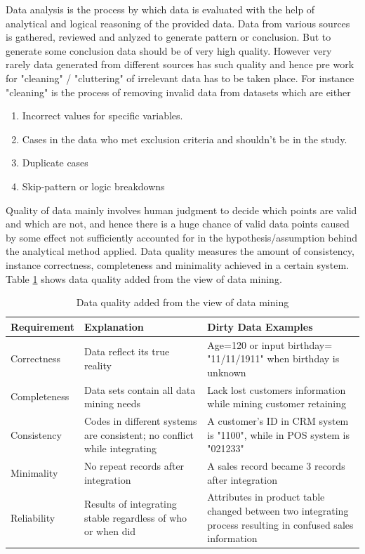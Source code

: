 \documentclass[article,type=msc,colorback,accentcolor=tud9c,twoside,11pt]{tudthesis}
\begin{document}
Data analysis is the process by which data is evaluated with the help of analytical and logical reasoning of the provided data. Data from various sources is gathered, reviewed and anlyzed to generate pattern or conclusion. But to generate some conclusion data should be of very high quality. However very rarely data generated from different sources has such quality and hence pre work for "cleaning" / "cluttering" of irrelevant data has to be taken place. For instance "cleaning" is the process of removing invalid data from datasets which are either
\begin{enumerate}
	\item Incorrect values for specific variables.
	\item Cases in the data who met exclusion criteria and shouldn’t be in the study.
	\item Duplicate cases
	\item Skip-pattern or logic breakdowns
\end{enumerate}
 Quality of data mainly involves human judgment to decide which points are valid and which are not, and hence there is a huge chance of valid data points caused by some effect not sufficiently accounted for in the hypothesis/assumption behind the analytical method applied. Data quality measures the amount of consistency, instance correctness, completeness and minimality achieved in a certain system. Table \ref{DataQuality} \cite{Dataquality} shows data quality added from the view of data mining.

\begin{table}[H]
	\centering
	\begin{tabular}{|p{3cm}|p{5cm}|p{7cm}|}
		\hline
		\textbf{Requirement} & \textbf{Explanation} & \textbf{Dirty Data Examples} 
	\\ \hline
		Correctness   & Data reflect its true reality             & Age=120 or input birthday= "11/11/1911" when birthday is unknown\\ \hline
		
	Completeness   & Data sets contain all data mining needs & Lack lost customers information while mining customer retaining\\ \hline
	
	Consistency  & Codes in different systems are consistent; no conflict while
	integrating  & A customer’s ID in CRM system is "1100", while in POS system is "021233"\\ \hline
	
	Minimality  & No repeat records after integration  &A sales record became 3 records after integration\\ \hline
	
	Reliability  & Results of integrating stable regardless of who or when did  & Attributes in product table changed between two integrating process resulting in confused sales information\\ \hline		
	\end{tabular}
	\caption{Data quality added from the view of data mining}
	\label{DataQuality}
\end{table}
\end{document}
